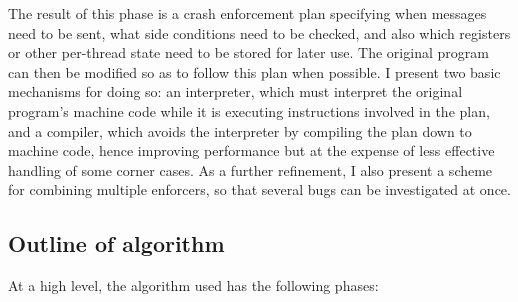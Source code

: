 The result of this phase is a crash enforcement plan specifying when
messages need to be sent, what side conditions need to be checked, and
also which registers or other per-thread state need to be stored for
later use.  The original program can then be modified so as to follow
this plan when possible.  I present two basic mechanisms for doing so:
an interpreter, which must interpret the original program's machine
code while it is executing instructions involved in the plan, and a
compiler, which avoids the interpreter by compiling the plan down to
machine code, hence improving performance but at the expense of less
effective handling of some corner cases.  As a further refinement, I
also present a scheme for combining multiple enforcers, so that
several bugs can be investigated at once.


\subsection{Outline of algorithm}

At a high level, the algorithm used has the following phases:


